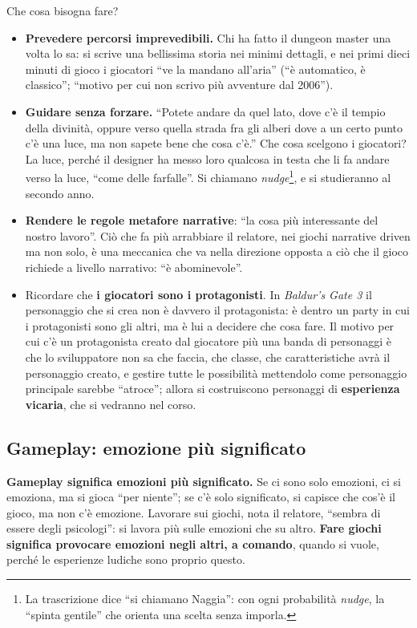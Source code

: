 Che cosa bisogna fare?
\begin{itemize}
  \item \textbf{Prevedere percorsi imprevedibili.} Chi ha fatto il dungeon
        master una volta lo sa: si scrive una bellissima storia nei minimi
        dettagli, e nei primi dieci minuti di gioco i giocatori ``ve la
        mandano all'aria'' (``è automatico, è classico''; ``motivo per cui
        non scrivo più avventure dal 2006'').
  \item \textbf{Guidare senza forzare.} ``Potete andare da quel lato, dove
        c'è il tempio della divinità, oppure verso quella strada fra gli
        alberi dove a un certo punto c'è una luce, ma non sapete bene che cosa
        c'è.'' Che cosa scelgono i giocatori? La luce, perché il designer ha
        messo loro qualcosa in testa che li fa andare verso la luce, ``come
        delle farfalle''. Si chiamano \emph{nudge}\footnote{La trascrizione
        dice ``si chiamano Naggia'': con ogni probabilità \emph{nudge}, la
        ``spinta gentile'' che orienta una scelta senza imporla.}, e si
        studieranno al secondo anno.
  \item \textbf{Rendere le regole metafore narrative}: ``la cosa più
        interessante del nostro lavoro''. Ciò che fa più arrabbiare il
        relatore, nei giochi narrative driven ma non solo, è una meccanica
        che va nella direzione opposta a ciò che il gioco richiede a livello
        narrativo: ``è abominevole''.
  \item Ricordare che \textbf{i giocatori sono i protagonisti}. In
        \emph{Baldur's Gate 3} il personaggio che si crea non è davvero il
        protagonista: è dentro un party in cui i protagonisti sono gli altri,
        ma è lui a decidere che cosa fare. Il motivo per cui c'è un
        protagonista creato dal giocatore più una banda di personaggi è che
        lo sviluppatore non sa che faccia, che classe, che caratteristiche
        avrà il personaggio creato, e gestire tutte le possibilità mettendolo
        come personaggio principale sarebbe ``atroce''; allora si costruiscono
        personaggi di \textbf{esperienza vicaria}, che si vedranno nel corso.
\end{itemize}

\subsection{Gameplay: emozione più significato}

\textbf{Gameplay significa emozioni più significato.} Se ci sono solo
emozioni, ci si emoziona, ma si gioca ``per niente''; se c'è solo significato,
si capisce che cos'è il gioco, ma non c'è emozione. Lavorare sui giochi,
nota il relatore, ``sembra di essere degli psicologi'': si lavora più sulle
emozioni che su altro. \textbf{Fare giochi significa provocare emozioni negli
altri, a comando}, quando si vuole, perché le esperienze ludiche sono
proprio questo.

